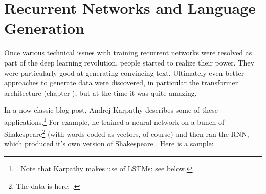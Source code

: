 

\section{Recurrent Networks and Language Generation}\label{languageModelsRecurrent}

Once various technical issues with training recurrent networks were resolved as part of the deep learning revolution, people started to realize their power. They were particularly good at generating convincing text. Ultimately even better approaches to generate data were discovered, in particular the transformer architecture (chapter ), but at the time it was quite amazing.

In a now-classic blog post, Andrej Karpathy describes some of these applications.\footnote{. Note that Karpathy makes use of LSTMs; see below.}  For example, he trained a neural network on a bunch of Shakespeare\footnote{The data is here: .}  (with words coded as vectors, of course) and then ran the RNN, which produced it's own version of Shakespeare \cite{karpathy2015unreasonable}. Here is a sample:

